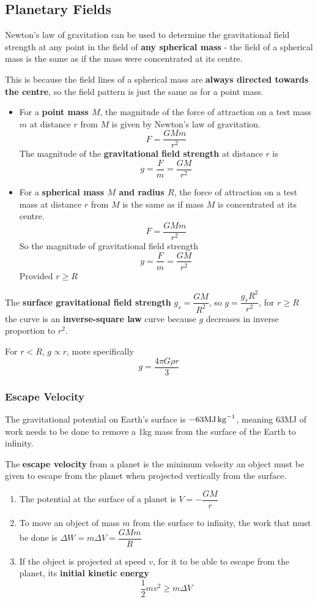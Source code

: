 \subsection{Planetary Fields}

Newton's law of gravitation can be used to determine the gravitational field strength at any point in the field of \textbf{any spherical mass} - the field of a spherical mass is the same as if the mass were concentrated at its centre.

This is because the field lines of a spherical mass are \textbf{always directed towards the centre}, so the field pattern is just the same as for a point mass.

\begin{itemize}
    \item For a \textbf{point mass $M$}, the magnitude of the force of attraction on a test mass $m$ at distance $r$ from $M$ is given by Newton's law of gravitation.
        $$F=\frac{GMm}{r^2}$$
        The magnitude of the \textbf{gravitational field strength} at distance $r$ is
        $$g=\frac{F}{m}=\frac{GM}{r^2}$$
    \item For a \textbf{spherical mass $M$ and radius $R$}, the force of attraction on a test mass at distance $r$ from $M$ is the same as if mass $M$ is concentrated at its centre.
        $$F=\frac{GMm}{r^2}$$
        So the magnitude of gravitational field strength
        $$g=\frac{F}{m}=\frac{GM}{r^2}$$
        Provided $r\geq R$
\end{itemize}

The \textbf{surface gravitational field strength} $g_s=\dfrac{GM}{R^2}$, so $g=\dfrac{g_sR^2}{r^2}$, for $r\geq R$ the curve is an \textbf{inverse-square law} curve because $g$ decreases in inverse proportion to $r^2$.

For $r<R$, $g\propto r$, more specifically
$$g=\frac{4\pi G\rho r}{3}$$

\subsubsection*{Escape Velocity}

The gravitational potential on Earth's surface is $-63\text{MJ\,kg}^{-1}$, meaning 63MJ of work needs to be done to remove a 1kg mass from the surface of the Earth to infinity.

The \textbf{escape velocity} from a planet is the minimum velocity an object must be given to escape from the planet when projected vertically from the surface.
\begin{enumerate}
    \item The potential at the surface of a planet is $V=-\dfrac{GM}{r}$
    \item To move an object of mass $m$ from the surface to infinity, the work that must be done is $\Delta W=m\Delta V=\dfrac{GMm}{R}$
    \item If the object is projected at speed $v$, for it to be able to escape from the planet, its \textbf{initial kinetic energy}
        $$\frac{1}{2}mv^2\geq m\Delta V$$
\end{enumerate}


